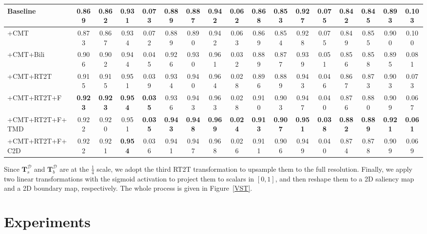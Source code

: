 \documentclass[10pt,twocolumn,letterpaper]{article}
\def\blu#1{\textbf{\color{blue} #1}} \def\red#1{\textbf{\color{red}\underline{#1}}}
\begin{document}
\begin{table*}[t]
\begin{tabular}{l|l|cccc|cccc|cccc|cccc}
\multicolumn{2}{l|}{Baseline}       &0.869 &0.862 &0.931 &0.073   &0.889 &0.887 &0.942 &0.062   &0.868 &0.853 &0.927 &0.075   &0.842 &0.845 &0.893 &0.103\\ \hline
\multicolumn{2}{l|}{+CMT}           &0.873 &0.867 &0.934 &0.072   &0.889 &0.890 &0.942 &0.063   &0.869 &0.854 &0.928 &0.075   &0.849 &0.855 &0.900 &0.100\\ \hline
\multicolumn{2}{l|}{+CMT+Bili}      &0.906 &0.902 &0.944 &0.045   &0.926 &0.930 &0.961 &0.032   &0.889 &0.877 &0.939 &0.051   &0.856 &0.858 &0.895 &0.081\\
\multicolumn{2}{l|}{+CMT+RT2T}       &0.915 &0.915 &0.951 &0.039   &0.934 &0.940 &0.964 &0.028   &0.896 &0.889 &0.943 &0.046   &0.867 &0.873 &0.903 &0.073\\ \hline
\multicolumn{2}{l|}{+CMT+RT2T+F}    &\blu{0.923} &\blu{0.923} &\blu{0.954} &\blu{0.035}   &0.936 &0.943 &0.963 &0.028   &0.910 &0.903 &0.947 &0.040   &0.876 &0.880 &0.909 &0.067\\
\multicolumn{2}{l|}{+CMT+RT2T+F+TMD}  &0.922 &0.920 &0.951 &\blu{0.035}   &\blu{0.943} &\blu{0.948} &\blu{0.969} &\blu{0.024}   &\blu{0.913} &\blu{0.907} &\blu{0.951} &\blu{0.038}   &\blu{0.882} &\blu{0.889} &\blu{0.921} &\blu{0.061}\\ \hline
\multicolumn{2}{l|}{+CMT+RT2T+F+C2D}  &0.922 &0.921 &\blu{0.954} &0.036   &0.941 &0.947 &0.968 &0.026   &0.911 &0.906 &0.949 &0.040   &0.874 &0.878 &0.909 &0.069\\ \hline
\end{tabular}
\label{ablationTab}
\vspace{-3mm}
\end{table*}



Since $\bm{T}_s^{\mathcal{D}}$ and $\bm{T}_b^{\mathcal{D}}$ are at the $\frac{1}{4}$ scale, we adopt the third RT2T transformation to upsample them to the full resolution.  Finally, we apply two linear transformations with the sigmoid activation to project them to scalars in $[0,1]$, and then reshape them to a 2D saliency map and a 2D boundary map, respectively. The whole process is given in Figure~\ref{VST}.


\section{Experiments}
\end{document}
